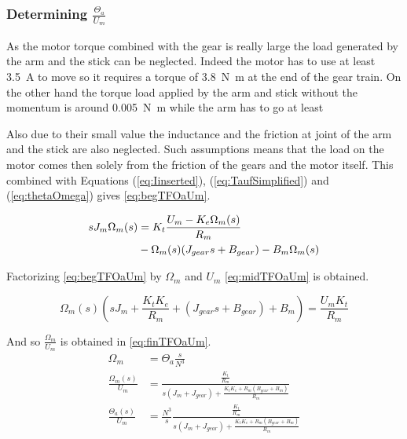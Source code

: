 \subsubsection{Determining $\frac{\Theta_a}{U_m}$ }


As the motor torque combined with the gear is really large the load generated by the arm and the stick can be neglected. Indeed the motor has to use at least \SI{3.5}{\ampere} to move so it requires a torque of \SI{3.8}{\newton\meter} at the end of the gear train. On the other hand the torque load applied by the arm and stick without the momentum is around \SI{0.005}{\newton\meter} while the arm has to go at least 

Also due to their small value the inductance and the friction at joint of the arm and the stick are also neglected. Such assumptions means that the load on the motor comes then solely from the friction of the gears and the motor itself. This combined with Equations (\ref{eq:Iinserted}), (\ref{eq:TaufSimplified}) and (\ref{eq:thetaOmega}) gives \autoref{eq:begTFOaUm}.


\begin{align}\label{eq:begTFOaUm}
	s J_{m} \Omega_m(s) &=K_{t} \frac{U_m-K_e \Omega_m(s)}{R_m} \notag \\ 
	&- \Omega_m(s) (J_{gear}s+B_{gear}) - B_{m} \Omega_m(s) \addunit{1}
\end{align}

Factorizing \autoref{eq:begTFOaUm} by $\Omega_m$ and $U_m$ \autoref{eq:midTFOaUm} is obtained.

\begin{equation}\label{eq:midTFOaUm}
	\Omega_m(s)\left(s J_m+\frac{K_t K_e}{ R_m} + (J_{gear}s+B_{gear}) + B_{m}  \right)=\frac{U_m K_t}{R_m}	
\end{equation}

And so $\frac{\Omega_m}{U_m}$ is obtained in \autoref{eq:finTFOaUm}.
\begin{subequations}\label{eq:finTFOaUm}
	\begin{align}
		\Omega_m&=\Theta_a\frac{s}{N^3}\\
		\frac{\Omega_m(s)}{U_m}&=\frac{\frac{ K_t}{R_m}}{s(J_m+J_{gear})+\frac{K_t K_e +R_m (B_{gear}+B_m)}{R_m}} \\
		\frac{\Theta_a(s)}{U_m}&=\frac{N^3}{s}\frac{\frac{ K_t}{R_m}}{s(J_m+J_{gear})+\frac{K_t K_e +R_m (B_{gear}+B_m)}{R_m}}
	\end{align}
\end{subequations}